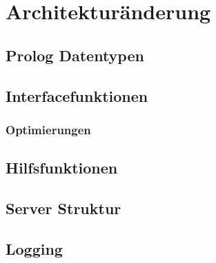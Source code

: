 


\section{Architekturänderung}

\subsection{Prolog Datentypen}




\subsection{Interfacefunktionen}

\subsubsection{Optimierungen}



\subsection{Hilfsfunktionen}



\subsection{Server Struktur}


\subsection{Logging}
